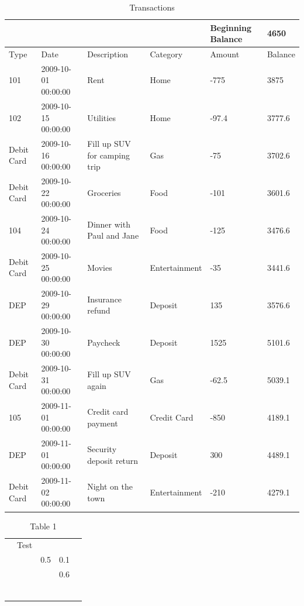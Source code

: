 \documentclass[11pt,a4paper]{article}
\begin{document}
\begin{table}[h]
\caption{Transactions}
\begin{tabular}{|l|l|l|l|l|l|}
\hline
 &  &  &  & Beginning Balance & 4650 \\ \hline
Type & Date & Description & Category & Amount & Balance \\ \hline
101 & 2009-10-01 00:00:00 & Rent & Home & -775 & 3875 \\ \hline
102 & 2009-10-15 00:00:00 & Utilities & Home & -97.4 & 3777.6 \\ \hline
Debit Card & 2009-10-16 00:00:00 & Fill up SUV for camping trip & Gas & -75 & 3702.6 \\ \hline
Debit Card & 2009-10-22 00:00:00 & Groceries & Food & -101 & 3601.6 \\ \hline
104 & 2009-10-24 00:00:00 & Dinner with Paul and Jane & Food & -125 & 3476.6 \\ \hline
Debit Card & 2009-10-25 00:00:00 & Movies & Entertainment & -35 & 3441.6 \\ \hline
DEP & 2009-10-29 00:00:00 & Insurance refund & Deposit & 135 & 3576.6 \\ \hline
DEP & 2009-10-30 00:00:00 & Paycheck & Deposit & 1525 & 5101.6 \\ \hline
Debit Card & 2009-10-31 00:00:00 & Fill up SUV again & Gas & -62.5 & 5039.1 \\ \hline
105 & 2009-11-01 00:00:00 & Credit card payment & Credit Card & -850 & 4189.1 \\ \hline
DEP & 2009-11-01 00:00:00 & Security deposit return & Deposit & 300 & 4489.1 \\ \hline
Debit Card & 2009-11-02 00:00:00 & Night on the town & Entertainment & -210 & 4279.1 \\ \hline
\end{tabular}
\end{table}

\begin{table}[h]
\caption{Table 1}
\begin{tabular}{|l|l|l|l|l|}
\hline
 &  &  &  &  \\ \hline
 & Test &  &  &  \\ \hline
 &  & 0.5 & 0.1 &  \\ \hline
 &  &  & 0.6 &  \\ \hline
 &  &  &  &  \\ \hline
 &  &  &  &  \\ \hline
 &  &  &  &  \\ \hline
 &  &  &  &  \\ \hline
 &  &  &  &  \\ \hline
 &  &  &  &  \\ \hline
\end{tabular}
\end{table}
\end{document}
